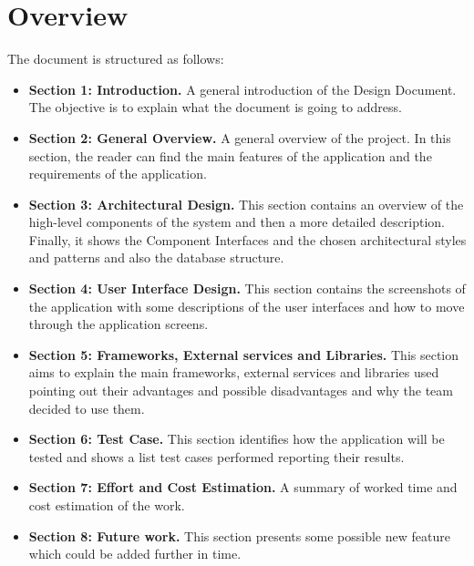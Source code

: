 	\section{Overview}
		The document is structured as follows:
		\begin{itemize}
			\item \textbf{Section 1: Introduction.} A general introduction of the Design Document. The objective is to explain what the document is going to address.

			\item \textbf {Section 2: General Overview.} A general overview of the project. In this section, the reader can find the main features of the application and
			the requirements of the application.

			\item \textbf{Section 3: Architectural Design.} This section contains an overview of the high-level components of the system and then a more detailed 
			description. Finally, it shows the Component Interfaces and the chosen architectural styles and patterns and also the database structure.
			
			\item \textbf{Section 4: User Interface Design.} This section contains the screenshots of the application with some descriptions of the user interfaces 
			and how to move through the application screens.
			
			\item \textbf{Section 5: Frameworks, External services and Libraries.} This section aims to explain the main frameworks, external services and libraries used 
			pointing out their advantages and possible disadvantages and why the team decided to use them.
			
			\item \textbf{Section 6: Test Case.} This section identifies how the application will be tested and shows a list test cases performed reporting their results.
			
			\item \textbf{Section 7: Effort and Cost Estimation.} A summary of worked time and cost estimation of the work.
			
			\item \textbf{Section 8: Future work.} This section presents some possible new feature which could be added further in time.
		\end{itemize}
